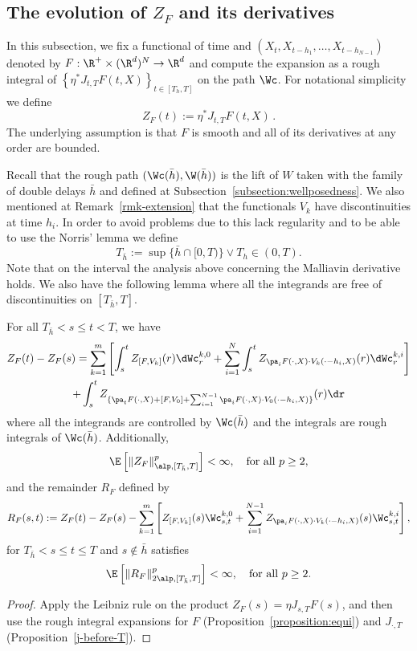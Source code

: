 \subsection{The evolution of \texorpdfstring{$Z_{F}$}{the Malliavin matrix} and its derivatives} In this subsection, we fix a functional of time and $(X_t, X_{t-h_1}, \dots,X_{t-h_{N-1}})$\linebreak denoted by $F:\R^+\times (\R^{d})^N\to \R^d$ and compute the expansion as a rough integral of $\left\{\eta^* J_{t,T}F(t,X) \right\}_{t\in[T_h,T]}$ on the path $\Wc$. For notational simplicity we define
\[
Z_F(t):= \eta^* J_{t,T}F(t,X) \, .
\]
The underlying assumption is that $F$ is smooth and all of its derivatives at any order are bounded.

Recall that the rough path $(\Wc(\bar h), \W(\bar h))$ is the lift of $W$ taken with the family of double delays $\bar h$ and defined at Subsection~\ref{subsection:wellposedness}. We also mentioned at Remark~\ref{rmk-extension} that the functionals $V_k$ have discontinuities at time $h_i$. In order to avoid problems due to this lack regularity and to be able to use the Norris' lemma we define
\[
T_{\bar h}:=\sup\{ \bar h \cap [0,T)\}\vee T_h \in (0,T).
\]
Note that on the interval the analysis above concerning the Malliavin derivative holds. We also have the following lemma where all the integrands are free of discontinuities on $[T_{\bar h},T]$.
\begin{lemm}\label{lem-zF}
For all $T_{\bar h}<s\leq t<T$, we have
\begin{multline}\label{eq:zF}
Z_{F}(t)-Z_{F}(s)  = \sum_{k=1}^m \left[\int_s^t Z_{[F, V_k]}(r) \dWc_r^{k,0}+ \sum_{i=1}^N \int_s^t Z_{\pa_i F (\cdot,X) \cdot V_k (\cdot-h_i,X)}(r)\dWc_r^{k,i} \right] \\
+\int_s^t Z_{\{\pa_t F(\cdot,X)+ [F,V_0]+\sum_{i=1}^{N-1} \pa_i F(\cdot,X) \cdot V_0(\cdot-h_i,X)\}}(r) \dr
\end{multline}
where all the integrands are controlled by $\Wc(\bar h)$ and the integrals are rough integrals of $ \Wc(\bar h)$. Additionally,
\begin{equation}
\E\left[\Vert Z_{F}\Vert^p_{\alp, [T_{\bar h},T]}\right]<\infty,\quad\text{for all }p\geq 2,
\end{equation}
and the remainder $R_{F}$ defined by
\[
R_{F}(s,t):= Z_{F}(t)-Z_{F}(s) -\sum_{k=1}^m \left[Z_{[F, V_k]}(s) \Wc_{s,t}^{k,0}+ \sum_{i=1}^{N-1} Z_{\pa_i F (\cdot,X) \cdot V_k (\cdot-h_i,X)}(s) \Wc_{s,t}^{k,i} \right],
\]
for $T_{\bar h}<s\leq t\leq T $ and $s\notin \bar h$ satisfies
\[
\E\left[\Vert R_{F}\Vert_{2\alp,[T_{\bar h},T]}^p\right]<\infty, \quad\text{for all } p\geq 2.
\]
\end{lemm}
\begin{proof}
Apply the Leibniz rule on the product $Z_F(s) = \eta J_{s,T} F(s)$, and then use the rough integral expansions for $F$ (Proposition~\ref{proposition:equi}) and $J_{\cdot, T}$ (Proposition~\ref{j-before-T}).
\end{proof}

